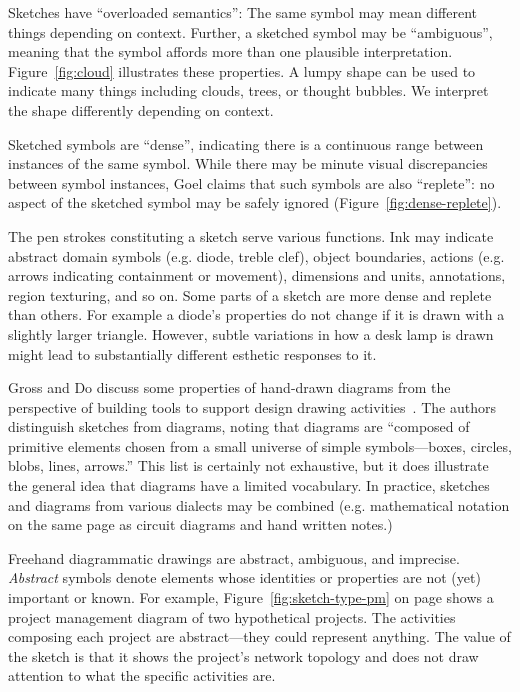 Sketches have ``overloaded semantics'': The same symbol may mean
different things depending on context. Further, a sketched symbol may
be ``ambiguous'', meaning that the symbol affords more than one
plausible interpretation.  Figure~\ref{fig:cloud} illustrates these
properties. A lumpy shape can be used to indicate many things
including clouds, trees, or thought bubbles. We interpret the shape
differently depending on context.

Sketched symbols are ``dense'', indicating there is a continuous range
between instances of the same symbol. While there may be minute visual
discrepancies between symbol instances, Goel claims that such symbols
are also ``replete'': no aspect of the sketched symbol may be safely
ignored (Figure~\ref{fig:dense-replete}).

The pen strokes constituting a sketch serve various functions. Ink may
indicate abstract domain symbols (e.g. diode, treble clef), object
boundaries, actions (e.g. arrows indicating containment or movement),
dimensions and units, annotations, region texturing, and so on. Some
parts of a sketch are more dense and replete than others. For example
a diode's properties do not change if it is drawn with a slightly
larger triangle. However, subtle variations in how a desk lamp is
drawn might lead to substantially different esthetic responses to it.



Gross and Do discuss some properties of hand-drawn diagrams from the
perspective of building tools to support design drawing
activities~\cite{gross-ecn-uist}. The authors distinguish sketches
from diagrams, noting that diagrams are ``composed of primitive
elements chosen from a small universe of simple symbols---boxes,
circles, blobs, lines, arrows.'' This list is certainly not
exhaustive, but it does illustrate the general idea that diagrams have
a limited vocabulary. In practice, sketches and diagrams from various
dialects may be combined (e.g. mathematical notation on the same page
as circuit diagrams and hand written notes.)

Freehand diagrammatic drawings are abstract, ambiguous, and
imprecise. \textit{Abstract} symbols denote elements whose identities
or properties are not (yet) important or known. For example,
Figure~\ref{fig:sketch-type-pm} on page \pageref{fig:sketch-type-pm}
shows a project management diagram of two hypothetical projects. The
activities composing each project are abstract---they could represent
anything. The value of the sketch is that it shows the project's
network topology and does not draw attention to what the specific
activities are. 

